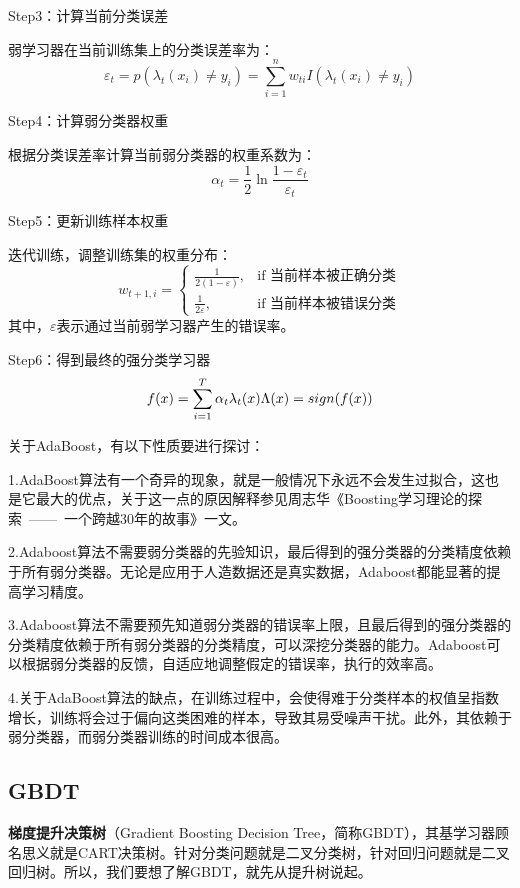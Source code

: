 Step3：计算当前分类误差

弱学习器在当前训练集上的分类误差率为：
\begin{equation}\varepsilon_t=p(\lambda_t(x_i)\neq y_i)=\sum_{i=1}^nw_{ti}I(\lambda_t(x_i)\neq y_i)\end{equation}

Step4：计算弱分类器权重

根据分类误差率计算当前弱分类器的权重系数为：
\begin{equation}\alpha_t=\frac12\ln\frac{1-\varepsilon_t}{\varepsilon_t}\end{equation}

Step5：更新训练样本权重

迭代训练，调整训练集的权重分布：
\begin{equation}
	w_{t+1,i} = \begin{cases}
		\frac{1}{2(1-\varepsilon)}, & \text{if 当前样本被正确分类} \\
		\frac{1}{2\varepsilon}, & \text{if 当前样本被错误分类}
	\end{cases}
\end{equation}
其中，$\varepsilon$表示通过当前弱学习器产生的错误率。

Step6：得到最终的强分类学习器
\begin{equation}f(x)=\sum_{i=1}^T\alpha_t\lambda_t(x)\\\Lambda(x)=sign(f(x))\end{equation}

关于AdaBoost，有以下性质要进行探讨：

1.AdaBoost算法有一个奇异的现象，就是一般情况下永远不会发生过拟合，这也是它最大的优点，关于这一点的原因解释参见周志华《Boosting学习理论的探索 —— 一个跨越30年的故事》一文。

2.Adaboost算法不需要弱分类器的先验知识，最后得到的强分类器的分类精度依赖于所有弱分类器。无论是应用于人造数据还是真实数据，Adaboost都能显著的提高学习精度。

3.Adaboost算法不需要预先知道弱分类器的错误率上限，且最后得到的强分类器的分类精度依赖于所有弱分类器的分类精度，可以深挖分类器的能力。Adaboost可以根据弱分类器的反馈，自适应地调整假定的错误率，执行的效率高。

4.关于AdaBoost算法的缺点，在训练过程中，会使得难于分类样本的权值呈指数增长，训练将会过于偏向这类困难的样本，导致其易受噪声干扰。此外，其依赖于弱分类器，而弱分类器训练的时间成本很高。

\subsection{GBDT}
\textbf{梯度提升决策树}（Gradient Boosting Decision Tree，简称GBDT），其基学习器顾名思义就是CART决策树。针对分类问题就是二叉分类树，针对回归问题就是二叉回归树。所以，我们要想了解GBDT，就先从提升树说起。
